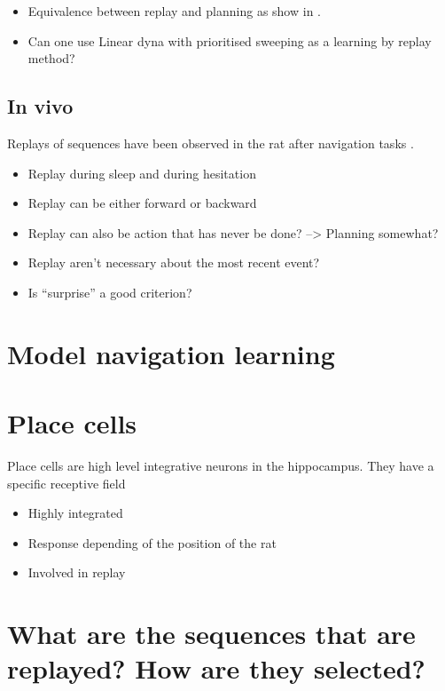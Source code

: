 \documentclass[]{article}
\begin{document}
\begin{itemize}
\item
  Equivalence between replay and planning as show in \cite{vanseijen_deeper_2015}.
\item
  Can one use Linear dyna with prioritised sweeping as a learning by replay method?
\end{itemize}

\subsection{In vivo}
\label{sub:In vivo}

Replays of sequences have been observed in the rat after navigation tasks \parencite{wilson_reactivation_1994,skaggs_replay_1996,davidson_hippocampal_2009,gupta_hippocampal_2010}.

\begin{itemize}
\item Replay during sleep and during hesitation
\item Replay can be either forward or backward
\item Replay can also be action that has never be done? --> Planning somewhat?
\item Replay aren't necessary about the most recent event?
\item Is ``surprise'' a good criterion?
\end{itemize}

\cite{gupta_hippocampal_2010}

\section{Model navigation
learning}\label{model-navigation-learning}

\section{Place cells}\label{place-cells}
Place cells are high level integrative neurons in the hippocampus. They have a specific receptive field

\begin{itemize}
  \item Highly integrated
  \item Response depending of the position of the rat
  \item Involved in replay
\end{itemize}


\section{What are the sequences that are replayed? How are they
selected?}\label{what-are-the-sequences-that-are-replayed-how-are-they-selected}
\end{document}
